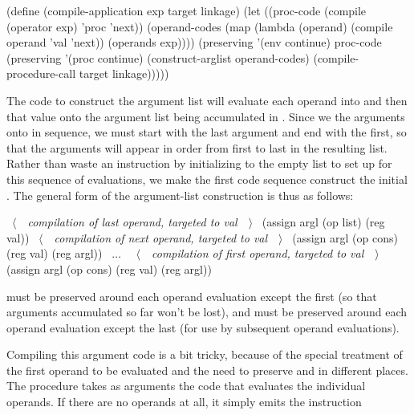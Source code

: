 \begin{codeBlock}
(define (compile-application exp target linkage)
  (let ((proc-code (compile (operator exp)
                            'proc
                            'next))
        (operand-codes
          (map (lambda
                 (operand)
                 (compile operand
                          'val
                          'next))
               (operands exp))))
    (preserving
      '(env continue)
      proc-code
      (preserving
        '(proc continue)
        (construct-arglist operand-codes)
        (compile-procedure-call target
                                linkage)))))
\end{codeBlock}

\noindent
The code to construct the argument list will evaluate each operand into
 and then  that value onto the argument list being
accumulated in .  Since we  the arguments onto
 in sequence, we must start with the last argument and end with the
first, so that the arguments will appear in order from first to last in the
resulting list.  Rather than waste an instruction by initializing 
to the empty list to set up for this sequence of evaluations, we make the first
code sequence construct the initial .  The general form of the
argument-list construction is thus as follows:

\begin{codeBlock}
~\(\langle \)~~\emph{compilation of last operand, targeted to \emph{val}}~~\(\rangle \)~
(assign argl (op list) (reg val))
~\(\langle \)~~\emph{compilation of next operand, targeted to \emph{val}}~~\(\rangle \)~
(assign argl (op cons) (reg val) (reg argl))
~\( \dots \)~
~\(\langle \)~~\emph{compilation of first operand, targeted to \emph{val}}~~\(\rangle \)~
(assign argl (op cons) (reg val) (reg argl))
\end{codeBlock}

\noindent
{} must be preserved around each operand evaluation except the first
(so that arguments accumulated so far won't be lost), and  must be
preserved around each operand evaluation except the last (for use by subsequent
operand evaluations).

Compiling this argument code is a bit tricky, because of the special treatment
of the first operand to be evaluated and the need to preserve  and
 in different places.  The  procedure takes
as arguments the code that evaluates the individual operands.  If there are no
operands at all, it simply emits the instruction

